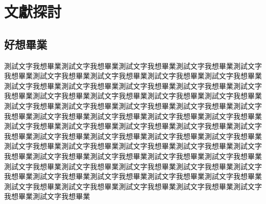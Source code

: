 \chapter{文獻探討}

\section{好想畢業}


測試文字我想畢業測試文字我想畢業測試文字我想畢業測試文字我想畢業測試文字我想畢業測試文字我想畢業測試文字我想畢業測試文字我想畢業測試文字我想畢業測試文字我想畢業測試文字我想畢業測試文字我想畢業測試文字我想畢業測試文字我想畢業測試文字我想畢業測試文字我想畢業測試文字我想畢業測試文字我想畢業測試文字我想畢業測試文字我想畢業測試文字我想畢業測試文字我想畢業測試文字我想畢業測試文字我想畢業測試文字我想畢業測試文字我想畢業測試文字我想畢業測試文字我想畢業測試文字我想畢業測試文字我想畢業測試文字我想畢業測試文字我想畢業測試文字我想畢業測試文字我想畢業測試文字我想畢業測試文字我想畢業測試文字我想畢業測試文字我想畢業測試文字我想畢業測試文字我想畢業測試文字我想畢業測試文字我想畢業測試文字我想畢業測試文字我想畢業測試文字我想畢業測試文字我想畢業測試文字我想畢業測試文字我想畢業測試文字我想畢業測試文字我想畢業測試文字我想畢業測試文字我想畢業測試文字我想畢業測試文字我想畢業測試文字我想畢業測試文字我想畢業測試文字我想畢業測試文字我想畢業測試文字我想畢業測試文字我想畢業



